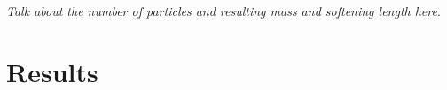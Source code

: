 \documentclass[twocolumns]{emulateapj}
\begin{document}






\textit{Talk about the number of particles and resulting mass and softening length here}.


\section{Results}
\end{document}
